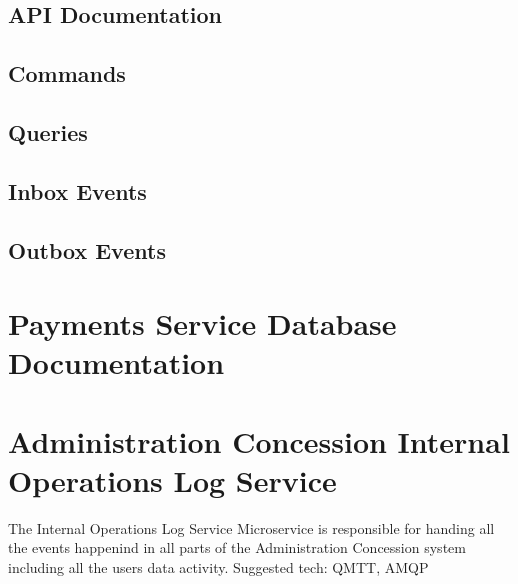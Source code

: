 \documentclass[letterpaper,10pt,english]{sphinxmanual}
\begin{document}


\subsection{API Documentation}
\label{\detokenize{administration_concession_system/orders_service:api-documentation}}

\subsection{Commands}
\label{\detokenize{administration_concession_system/orders_service:commands}}

\subsection{Queries}
\label{\detokenize{administration_concession_system/orders_service:queries}}

\subsection{Inbox Events}
\label{\detokenize{administration_concession_system/orders_service:inbox-events}}

\subsection{Outbox Events}
\label{\detokenize{administration_concession_system/orders_service:outbox-events}}

\section{Payments Service Database Documentation}
\label{\detokenize{administration_concession_system/orders_service:payments-service-database-documentation}}
\sphinxstepscope


\section{Administration Concession Internal Operations Log Service}
\label{\detokenize{administration_concession_system/internal_operations_log_service:administration-concession-internal-operations-log-service}}\label{\detokenize{administration_concession_system/internal_operations_log_service::doc}}
\sphinxAtStartPar
The Internal Operations Log Service Microservice is responsible for handing all the events happenind in all parts of the Administration Concession system including all the users data activity.
Suggested tech: QMTT, AMQP
\end{document}
